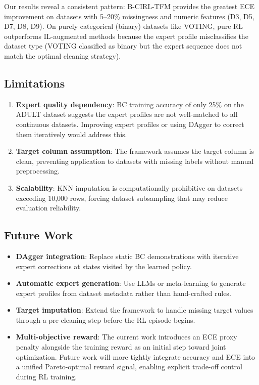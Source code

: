 \documentclass[conference]{IEEEtran}
\begin{document}
Our results reveal a consistent pattern: B-CIRL-TFM provides the greatest
ECE improvement on datasets with 5--20\% missingness and numeric features
(D3, D5, D7, D8, D9). On purely categorical (binary) datasets like VOTING,
pure RL outperforms IL-augmented methods because the expert profile
misclassifies the dataset type (VOTING classified as binary but the
expert sequence does not match the optimal cleaning strategy).

\subsection{Limitations}

\begin{enumerate}
    \item \textbf{Expert quality dependency}: BC training accuracy of only
    25\% on the ADULT dataset suggests the expert profiles are not well-matched
    to all continuous datasets. Improving expert profiles or using DAgger
    to correct them iteratively would address this.
    \item \textbf{Target column assumption}: The framework assumes the target
    column is clean, preventing application to datasets with missing labels
    without manual preprocessing.
    \item \textbf{Scalability}: KNN imputation is computationally prohibitive
    on datasets exceeding 10,000 rows, forcing dataset subsampling that may
    reduce evaluation reliability.
\end{enumerate}

\subsection{Future Work}

\begin{itemize}
    \item \textbf{DAgger integration}: Replace static BC demonstrations
    with iterative expert corrections at states visited by the learned policy.
    \item \textbf{Automatic expert generation}: Use LLMs or meta-learning
    to generate expert profiles from dataset metadata rather than hand-crafted rules.
    \item \textbf{Target imputation}: Extend the framework to handle
    missing target values through a pre-cleaning step before the RL episode begins.
    \item \textbf{Multi-objective reward}: The current work introduces an ECE
    proxy penalty alongside the training reward as an initial step toward joint
    optimization. Future work will more tightly integrate accuracy and ECE into
    a unified Pareto-optimal reward signal, enabling explicit trade-off control
    during RL training.
\end{itemize}
\end{document}
